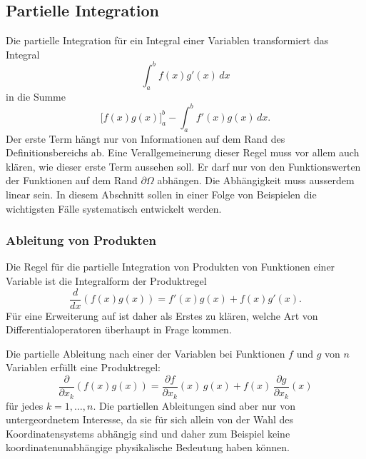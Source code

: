 %
%
%

%
%
\subsection{Partielle Integration
\label{buch:felder:subsection:partint}}
Die partielle Integration für ein Integral einer Variablen
transformiert das Integral
\[
\int_{a}^{b} f(x) g'(x)\,dx
\]
in die Summe
\[
\biggl[ f(x) g(x) \biggr]_a^b
-
\int_a^b f'(x) g(x)\,dx.
\]
Der erste Term hängt nur von Informationen auf dem Rand des 
Definitionsbereichs ab.
Eine Verallgemeinerung dieser Regel muss vor allem auch klären,
wie dieser erste Term aussehen soll.
Er darf nur von den Funktionswerten der Funktionen auf dem Rand
$\partial\Omega$ abhängen.
Die Abhängigkeit muss ausserdem linear sein.
In diesem Abschnitt sollen in einer Folge von Beispielen die
wichtigsten Fälle systematisch entwickelt werden.

%
%
\subsubsection{Ableitung von Produkten}
Die Regel für die partielle Integration von Produkten von Funktionen
einer Variable ist die Integralform der Produktregel
\[
\frac{d}{dx}(f(x)g(x)) = f'(x)g(x) + f(x)g'(x).
\]
Für eine Erweiterung auf ist daher als Erstes zu klären, welche Art
von Differentialoperatoren überhaupt in Frage kommen.

Die partielle Ableitung nach einer der Variablen bei Funktionen
$f$ und $g$ von $n$ Variablen erfüllt eine Produktregel:
\[
\frac{\partial}{\partial x_k}
(f(x)g(x))
=
\frac{\partial f}{\partial x_k}(x)\,g(x)
+
f(x)
\,
\frac{\partial g}{\partial x_k}(x)
\]
für jedes $k=1,\dots,n$.
Die partiellen Ableitungen sind aber nur von untergeordnetem Interesse,
da sie für sich allein von der Wahl des Koordinatensystems abhängig 
sind und daher zum Beispiel keine koordinatenunabhängige physikalische
Bedeutung haben können.

